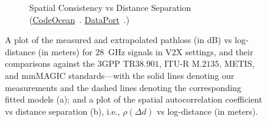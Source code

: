 \documentclass[10pt, twocolumn]{IEEEtran}
\begin{document}
{\begin{figure} [t]
\begin{subfigure}{0.5\linewidth}
        \caption{Spatial Consistency vs Distance Separation (\href{https://codeocean.com/capsule/9545863/tree}{CodeOcean}~\cite{CodeOcean}. \href{http://ieee-dataport.org/12580}{DataPort}~\cite{DataPort}.)}
        \label{F7b}
    \end{subfigure}
    \vspace{-3mm}
    \caption{A plot of the measured and extrapolated pathloss (in dB) vs log-distance (in meters) for \SI{28}{\giga\hertz} signals in V$2$X settings, and their comparisons against the $3$GPP TR$38.901$, ITU-R M.$2135$, METIS, and mmMAGIC standards---with the solid lines denoting our measurements and the dashed lines denoting the corresponding fitted models (a); and a plot of the spatial autocorrelation coefficient vs distance separation (b), i.e., $\rho(\Delta d)$ vs log-distance (in meters).}
    \vspace{-3mm}
    \label{F7}
\end{figure}
}
\end{document}
